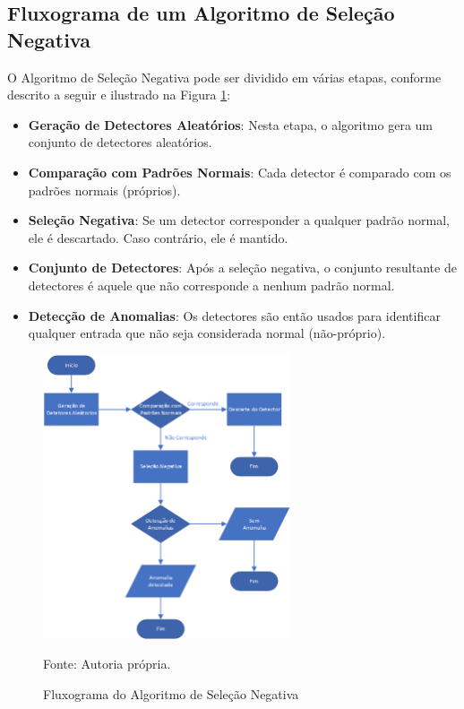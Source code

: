 \newpage
\subsection{Fluxograma de um Algoritmo de Seleção Negativa} \thispagestyle{mystyle}

O Algoritmo de Seleção Negativa pode ser dividido em várias etapas, conforme descrito a seguir e ilustrado na Figura \ref{fig:fluxograma_selecao_negativa}:

\begin{itemize}
    \item \textbf{Geração de Detectores Aleatórios}: Nesta etapa, o algoritmo gera um conjunto de detectores aleatórios.
    
    \item \textbf{Comparação com Padrões Normais}: Cada detector é comparado com os padrões normais (próprios).
    
    \item \textbf{Seleção Negativa}: Se um detector corresponder a qualquer padrão normal, ele é descartado. Caso contrário, ele é mantido.
    
    \item \textbf{Conjunto de Detectores}: Após a seleção negativa, o conjunto resultante de detectores é aquele que não corresponde a nenhum padrão normal.
    
    \item \textbf{Detecção de Anomalias}: Os detectores são então usados para identificar qualquer entrada que não seja considerada normal (não-próprio).
\end{itemize}

\begin{figure}[h]
\centering
\includegraphics[width=0.65\textwidth]{imgs/algoritmo_selecao_negativa.png}
\caption{Fluxograma do Algoritmo de Seleção Negativa}
\label{fig:fluxograma_selecao_negativa}
Fonte: Autoria própria.
\end{figure}

